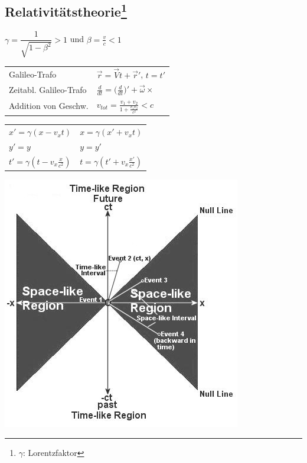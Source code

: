 \documentclass[12pt,a4paper, twoside]{article}
\renewcommand{\d}[2]{\frac{d #1}{d #2}}
\renewcommand{\=}[1]{\stackrel{#1}{=}}
\theoremstyle{definition}
\theoremstyle{remark}
\begin{document}
\subsection[Relativitätstheorie]{Relativitätstheorie\let\thefootnote\relax\footnote{$\gamma$: Lorentzfaktor}}

\begin{framed}
\centering
$\gamma = \dfrac{1}{\sqrt{1 - \beta^2}} > 1$ und $\beta = \frac{v}{c} <1$
\end{framed}

\begin{center}
\begin{framed}
\begin{tabular}{ll}
Galileo-Trafo & $\vec{r} = \vec{V}t + \vec{r}'$, $t = t'$\\
Zeitabl. Galileo-Trafo & $\d{}{t} = \Big(\d{}{t}\Big)' + \vec{\omega} \times$\\
Addition von Geschw. & $v_{tot} = \frac{v_1 + v_2}{1 + \frac{v_1 v_2}{c^2}} < c$\\
\end{tabular}
\end{framed}
\end{center}

\begin{center}
\begin{framed}
\begin{tabular}{ll}
$x\prime=\gamma(x - v_xt)$ & $x=\gamma(x\prime+v_xt)$ \\
$y\prime=y$ & $y=y\prime$\\
$t\prime=\gamma(t-v_x \frac{x}{c^2})$ & $t=\gamma(t\prime+v_x \frac{x\prime}{c^2})$\\
\end{tabular}
\end{framed}
\end{center}

\includegraphics[width=0.45\linewidth]{pic/minkowski.jpg}
\end{document}
